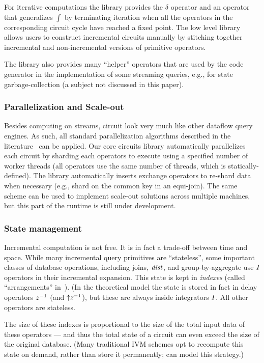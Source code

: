 For iterative computations the library provides the $\delta$ operator
and an operator that generalizes $\int$ by terminating iteration when
all the operators in the corresponding circuit cycle have reached a
fixed point.  The low level library allows users to construct
incremental circuits manually by stitching together incremental and
non-incremental versions of primitive operators.

The library also provides many ``helper'' operators that are used by
the code generator in the implementation of some streaming queries,
e.g., for state garbage-collection (a subject not discussed in this
paper).

\subsubsection{Parallelization and Scale-out}

Besides computing on streams, \dbsp circuit look very much like other
dataflow query engines.  As such, all standard parallelization
algorithms described in the literature~\cite{Graefe-sigmod90} can be
applied.  Our core circuits library automatically parallelizes each
circuit by sharding each operators to execute using a specified number
of worker threads (all operators use the same number of threads, which
is statically-defined).  The library automatically inserts exchange
operators to re-shard data when necessary (e.g., shard on the common
key in an equi-join).  The same scheme can be used to implement
scale-out solutions across multiple machines, but this part of the
runtime is still under development.

\subsubsection{State management}\label{sec:state-management}

Incremental computation is not free.  It is in fact a trade-off
between time and space.  While many incremental query primitives are
``stateless'', some important classes of database operations,
including joins, $\mathit{dist}$, and group-by-aggregate use $\mathit{I}$
operators in their incremental expansion.  This state is kept in
\emph{indexes} (called ``arrangements'' in~\cite{mcsherry-vldb20}).
(In the \dbsp theoretical model the state is stored in fact in delay
operators $z^{-1}$ (and ${\uparrow}z^{-1}$), but these are always inside
integrators $\mathit{I}$.  All other operators are stateless.

The size of these indexes is proportional to the size of the total
input data of these operators --- and thus the total state of a
circuit can even exceed the size of the original database.  (Many
traditional IVM schemes opt to recompute this state on demand, rather
than store it permanently; \dbsp can model this strategy.)

